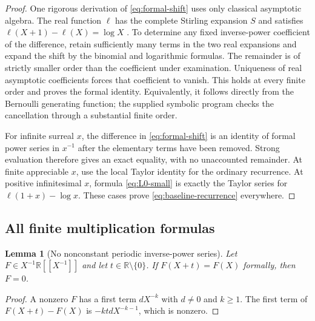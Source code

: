 \documentclass[11pt,letterpaper]{article}
\numberwithin{equation}{section}
\theoremstyle{plain}
\newtheorem{lemma}[lemma]{Lemma}
\theoremstyle{definition}
\theoremstyle{remark}
\newcommand{\R}{\mathbb R}
\begin{document}
\begin{proof}
One rigorous derivation of \eqref{eq:formal-shift} uses only classical
asymptotic algebra. The real function $\ell$ has the complete Stirling
expansion $S$ and satisfies $\ell(X+1)-\ell(X)=\log X$
\cite{DLMF55,DLMF511}. To determine any fixed inverse-power coefficient of
the difference, retain sufficiently many terms in the two real expansions
and expand the shift by the binomial and logarithmic formulas. The remainder
is of strictly smaller order than the coefficient under examination.
Uniqueness of real asymptotic coefficients forces that coefficient to vanish.
This holds at every finite order and proves the formal identity. Equivalently,
it follows directly from the Bernoulli generating function; the supplied
symbolic program checks the cancellation through a substantial finite order.

For infinite surreal $x$, the difference in \eqref{eq:formal-shift} is an
identity of formal power series in $x^{-1}$ after the elementary terms have
been removed. Strong evaluation therefore gives an exact equality, with no
unaccounted remainder. At finite appreciable $x$, use the local Taylor
identity for the ordinary recurrence. At positive infinitesimal $x$, formula
\eqref{eq:L0-small} is exactly the Taylor series for $\ell(1+x)-\log x$.
These cases prove \eqref{eq:baseline-recurrence} everywhere.
\end{proof}

\subsection{All finite multiplication formulas}
\begin{lemma}[No nonconstant periodic inverse-power series]\label{lem:periodic}
Let $F\in X^{-1}\R[[X^{-1}]]$ and let $t\in\R\setminus\{0\}$.
If $F(X+t)=F(X)$ formally, then $F=0$.
\end{lemma}
\begin{proof}
A nonzero $F$ has a first term $dX^{-k}$ with $d\ne0$ and $k\ge1$.
The first term of $F(X+t)-F(X)$ is $-ktdX^{-k-1}$, which is nonzero.
\end{proof}
\end{document}
